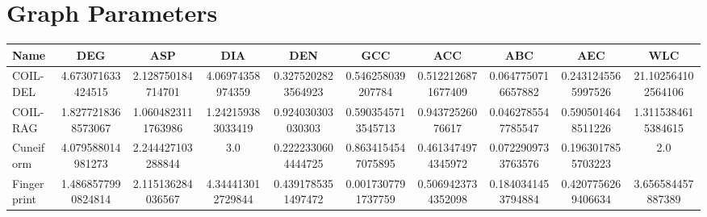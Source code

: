 

\chapter{Graph Parameters}\label{chap:graph-parameters}

\begin{sidewaystable} %
    \centering
    \small %
    \begin{tabular}{l
                    S[round-mode=places, round-precision=4]
                    S[round-mode=places, round-precision=4]
                    S[round-mode=places, round-precision=4]
                    S[round-mode=places, round-precision=4]
                    S[round-mode=places, round-precision=4]
                    S[round-mode=places, round-precision=4]
                    S[round-mode=places, round-precision=4]
                    S[round-mode=places, round-precision=4]
                    S[round-mode=places, round-precision=4]} %
        \toprule
        \textbf{Name} & \textbf{DEG} & \textbf{ASP} & \textbf{DIA} & \textbf{DEN} & \textbf{GCC} & \textbf{ACC} & \textbf{ABC} & \textbf{AEC} & \textbf{WLC} \\
        \midrule
        COIL-DEL & 4.673071633424515 & 2.128750184714701 & 4.06974358974359 & 0.3275202823564923 & 0.546258039207784 & 0.5122126871677409 & 0.0647750716657882 & 0.2431245565997526 & 21.102564102564106 \\ \hline
        COIL-RAG & 1.8277218368573067 & 1.0604823111763986 & 1.242159383033419 & 0.924030303030303 & 0.5903545713545713 & 0.94372526076617 & 0.0462785547785547 & 0.5905014648511226 & 1.3115384615384615 \\ \hline
        Cuneiform & 4.079588014981273 & 2.244427103288844 & 3.0 & 0.2222330604444725 & 0.8634154547075895 & 0.4613474974345972 & 0.0722909733763576 & 0.1963017855703223 & 2.0 \\ \hline
        Fingerprint & 1.4868577990824814 & 2.115136284036567 & 4.344413012729844 & 0.4391785351497472 & 0.0017307791737759 & 0.5069423734352098 & 0.1840341453794884 & 0.4207756269406634 & 3.656584457887389 \\ \hline

\end{tabular}
\end{sidewaystable}
